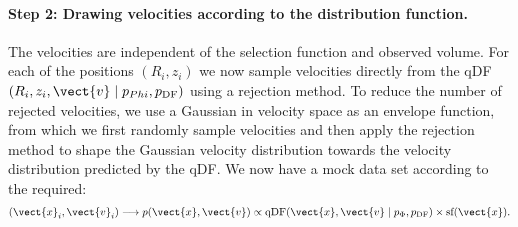 \paragraph{Step 2: Drawing velocities according to the distribution function.} The velocities are independent of the selection function and observed volume. For each of the positions $(R_i,z_i)$ we now sample velocities directly from the qDF$(R_i,z_i,\vect{v} \mid p_{Phi},p_\text{DF})$ using a rejection method. To reduce the number of rejected velocities, we use a Gaussian in velocity space as an envelope function, from which we first randomly sample velocities and then apply the rejection method to shape the Gaussian velocity distribution towards the velocity distribution predicted by the qDF. We now have a mock data set according to the required:
\begin{equation*}
(\vect{x}_i,\vect{v}_i) \longrightarrow p(\vect{x},\vect{v}) \propto \text{qDF}(\vect{x},\vect{v} \mid p_{\Phi},p_\text{DF}) \times \text{sf}(\vect{x}).
\end{equation*} 


